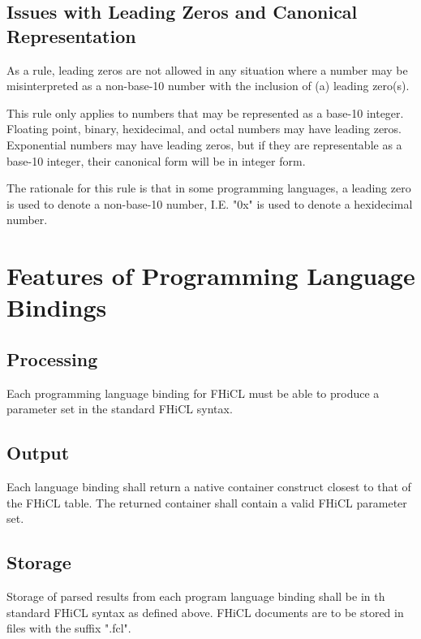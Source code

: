 \documentclass{memarticle}
\begin{document}
{        \section{Issues with Leading Zeros and Canonical Representation}
                As a rule, leading zeros are not allowed
                in any situation where a number may be misinterpreted as a non-base-10 number
                with the inclusion of (a) leading zero(s).
                \par
                This rule only applies to numbers that may be represented as a base-10 integer.
                Floating point, binary, hexidecimal, and octal numbers may have leading zeros.
                Exponential numbers may have leading zeros, but if they are representable as a base-10 integer,
                their canonical form will be in integer form.
                \par
                The rationale for this rule is that in some programming languages,
                a leading zero is used to denote a non-base-10 number,
                I.E. "0x" is used to denote a hexidecimal number.
}   
\chapter{Features of Programming Language Bindings}
        \section{Processing}
                Each programming language binding for FHiCL must be able to produce a parameter set
                in the standard FHiCL syntax. 
        
        \section{Output}
                Each language binding shall return a native container construct closest to that of the FHiCL table.
                The returned container shall contain a valid FHiCL parameter set.

        \section{Storage}    
                Storage of parsed results from each program language binding shall be in th standard FHiCL syntax as defined above.
                FHiCL documents are to be stored in files with the suffix ".fcl".
\end{document}
